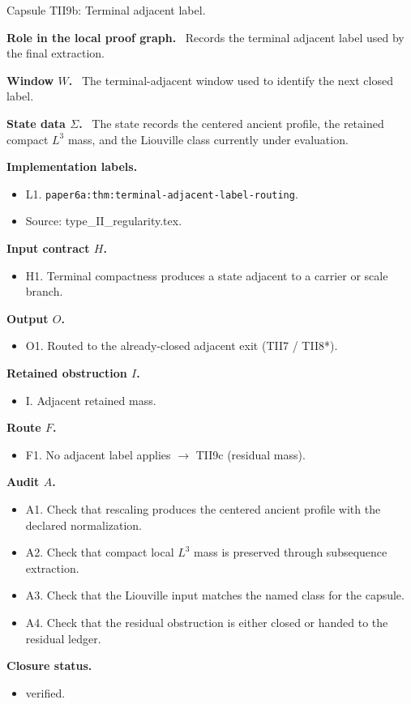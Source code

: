 \documentclass[11pt]{amsart}
\newcommand{\capsulefield}[1]{\par\smallskip\noindent\textbf{#1.}\ }
\begin{document}
\begin{proofcapsule}{Capsule TII9b: Terminal adjacent label.}
  \capsulefield{Role in the local proof graph}
  Records the terminal adjacent label used by the final extraction.

  \capsulefield{Window \(W\)}
The terminal-adjacent window used to identify the next closed label.

  \capsulefield{State data \(\Sigma\)}
The state records the centered ancient profile, the retained compact $L^3$ mass, and the Liouville class currently under evaluation.

  \capsulefield{Implementation labels}
  \begin{itemize}[leftmargin=1.8em]
  \item L1. \texttt{paper6a:thm:terminal-adjacent-label-routing}.
  \item Source: type\_II\_regularity.tex.
  \end{itemize}

  \capsulefield{Input contract \(H\)}
  \begin{itemize}[leftmargin=1.8em]
  \item H1. Terminal compactness produces a state adjacent to a carrier or scale branch.
  \end{itemize}

  \capsulefield{Output \(O\)}
  \begin{itemize}[leftmargin=1.8em]
  \item O1. Routed to the already-closed adjacent exit (TII7 / TII8*).
  \end{itemize}

  \capsulefield{Retained obstruction \(I\)}
  \begin{itemize}[leftmargin=1.8em]
  \item I. Adjacent retained mass.
  \end{itemize}

  \capsulefield{Route \(F\)}
  \begin{itemize}[leftmargin=1.8em]
  \item F1. No adjacent label applies $\to$ TII9c (residual mass).
  \end{itemize}

  \capsulefield{Audit \(A\)}
  \begin{itemize}[leftmargin=1.8em]
  \item A1. Check that rescaling produces the centered ancient profile with the declared normalization.
  \item A2. Check that compact local $L^3$ mass is preserved through subsequence extraction.
  \item A3. Check that the Liouville input matches the named class for the capsule.
  \item A4. Check that the residual obstruction is either closed or handed to the residual ledger.
  \end{itemize}
  \capsulefield{Closure status}
  \begin{itemize}[leftmargin=1.8em]
  \item verified.
  \end{itemize}
\end{proofcapsule}
\end{document}
